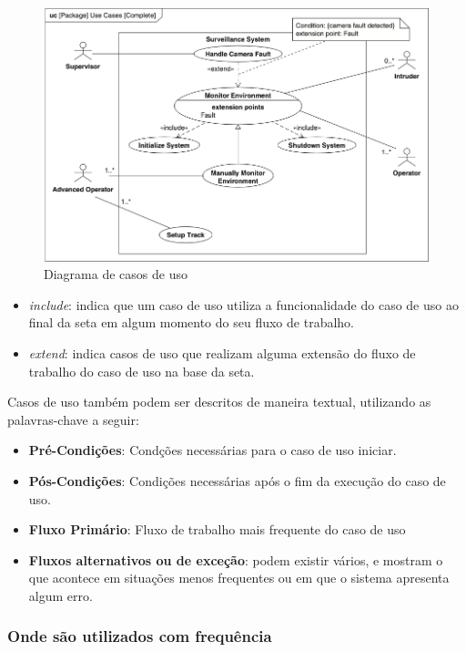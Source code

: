 \begin{figure}[h]
\centering
\includegraphics[width=\textwidth,height=\textheight,keepaspectratio]{figures/diagrama-caso-de-uso-3.png}
\caption{Diagrama de casos de uso}
\label{fig:use_case_diagram}
\end{figure}


\begin{itemize}
\item \textit{include}: indica que um caso de uso utiliza a funcionalidade do caso de uso ao final da seta em algum momento do seu fluxo de trabalho. 
\item \textit{extend}: indica casos de uso que realizam alguma extensão do fluxo de trabalho do caso de uso na base da seta. 
\end{itemize}

Casos de uso também podem ser descritos de maneira textual, utilizando as palavras-chave a seguir:
\begin{itemize}
\item \textbf{Pré-Condições}: Condções necessárias para o caso de uso iniciar.
\item \textbf{Pós-Condições}: Condições necessárias após o fim da execução do caso de uso.
\item \textbf{Fluxo Primário}: Fluxo de trabalho mais frequente do caso de uso
\item \textbf{Fluxos alternativos ou de exceção}: podem existir vários, e mostram o que acontece em situações menos frequentes ou em que o sistema apresenta algum erro.
\end{itemize}

\subsubsection{Onde são utilizados com frequência}

